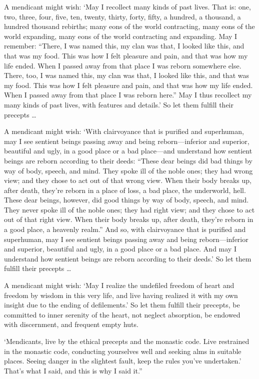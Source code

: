 \documentclass[12pt,openany]{book}%
\begin{document}
A mendicant might wish: ‘May I recollect many kinds of past lives. That is: one, two, three, four, five, ten, twenty, thirty, forty, fifty, a hundred, a thousand, a hundred thousand rebirths; many eons of the world contracting, many eons of the world expanding, many eons of the world contracting and expanding. May I remember: “There, I was named this, my clan was that, I looked like this, and that was my food. This was how I felt pleasure and pain, and that was how my life ended. When I passed away from that place I was reborn somewhere else. There, too, I was named this, my clan was that, I looked like this, and that was my food. This was how I felt pleasure and pain, and that was how my life ended. When I passed away from that place I was reborn here.” May I thus recollect my many kinds of past lives, with features and details.’ So let them fulfill their precepts … 

A mendicant might wish: ‘With clairvoyance that is purified and superhuman, may I see sentient beings passing away and being reborn—inferior and superior, beautiful and ugly, in a good place or a bad place—and understand how sentient beings are reborn according to their deeds: “These dear beings did bad things by way of body, speech, and mind. They spoke ill of the noble ones; they had wrong view; and they chose to act out of that wrong view. When their body breaks up, after death, they’re reborn in a place of loss, a bad place, the underworld, hell. These dear beings, however, did good things by way of body, speech, and mind. They never spoke ill of the noble ones; they had right view; and they chose to act out of that right view. When their body breaks up, after death, they’re reborn in a good place, a heavenly realm.” And so, with clairvoyance that is purified and superhuman, may I see sentient beings passing away and being reborn—inferior and superior, beautiful and ugly, in a good place or a bad place. And may I understand how sentient beings are reborn according to their deeds.’ So let them fulfill their precepts … 

A mendicant might wish: ‘May I realize the undefiled freedom of heart and freedom by wisdom in this very life, and live having realized it with my own insight due to the ending of defilements.’ So let them fulfill their precepts, be committed to inner serenity of the heart, not neglect absorption, be endowed with discernment, and frequent empty huts. 

‘Mendicants, live by the ethical precepts and the monastic code. Live restrained in the monastic code, conducting yourselves well and seeking alms in suitable places. Seeing danger in the slightest fault, keep the rules you’ve undertaken.’ That’s what I said, and this is why I said it.” 
\end{document}
